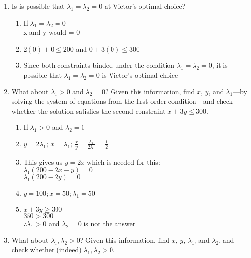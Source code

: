 \documentclass[11pt]{article}
\begin{document}
\begin{enumerate}
\begin{enumerate}
        \item Is is possible that $\lambda_{1}=\lambda_{2}=0$ at Victor's optimal choice?

            \begin{enumerate}
                \item If $\lambda_1 = \lambda_2 = 0$\\
                x and y would = 0 
                \item $2(0) + 0 \leq 200$ and $0 +3(0) \leq 300$
                \item Since both constraints binded under the condition $\lambda_1 = \lambda_2 = 0$, it is possible that $\lambda_1 = \lambda_2 = 0$ is Victor's optimal choice
            \end{enumerate}

        \item What about $\lambda_{1}>0$ and $\lambda_{2}=0$? Given this information, find $x$, $y$, and $\lambda_{1}$---by solving the system of equations from the first-order condition---and check whether the solution satisfies the second constraint $x+3y\leq 300$.
        
            \begin{enumerate}
                \item If $\lambda_1 > 0$ and $\lambda_2 = 0$
                \item $y = 2\lambda_1$; $x = \lambda_1$; $\frac{x}{y} = \frac{\lambda_1}{2\lambda_1} = \frac{1}{2}$\\
                \item This gives us $y= 2x$ which is needed for this:\\
                $\lambda_1 (200-2x-y) = 0$\\
                $\lambda_1 (200 -2y) = 0$
                \item $y =100; x = 50; \lambda_1 = 50$
                \item $x + 3y \geq 300$\\
                $350 > 300$\\
                $\therefore \lambda_1 > 0$ and $\lambda_2 = 0$ is not the answer
                
            \end{enumerate}

        \item What about $\lambda_{1},\lambda_{2}>0$? Given this information, find $x$, $y$, $\lambda_{1}$, and $\lambda_{2}$, and check whether (indeed) $\lambda_{1},\lambda_{2}>0$.
        

\end{enumerate}
\end{enumerate}
\end{document}
